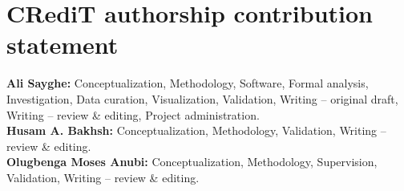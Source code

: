\section*{CRediT authorship contribution statement}
\noindent\textbf{Ali Sayghe:} Conceptualization, Methodology, Software, Formal analysis, Investigation, Data curation, Visualization, Validation, Writing -- original draft, Writing -- review \& editing, Project administration.\\
\textbf{Husam A. Bakhsh:} Conceptualization, Methodology, Validation, Writing -- review \& editing.\\
\textbf{Olugbenga Moses Anubi:} Conceptualization, Methodology, Supervision, Validation, Writing -- review \& editing.
